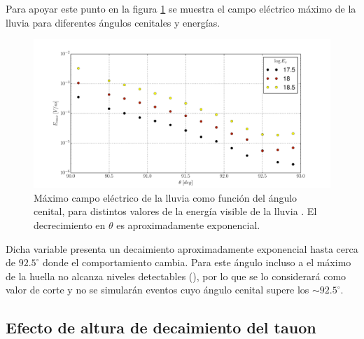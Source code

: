 	Para apoyar este punto en la figura \ref{fig:theta_dependence2} se muestra el campo el\'ectrico m\'aximo de la lluvia para diferentes \'angulos cenitales y energ\'ias.
	\begin{figure}[ht!]
		\centering
		\includegraphics[width=\textwidth]{./fig/simulacionRadio/maxDep/eMaxTh.pdf}
		\caption{\label{fig:theta_dependence2}
		M\'aximo campo el\'ectrico de la lluvia como funci\'on del \'angulo cenital, para distintos valores de la energ\'ia visible de la lluvia \ev{}. El decrecimiento en $\theta$ es aproximadamente exponencial.
		}
	\end{figure}
	Dicha variable presenta un decaimiento aproximadamente exponencial hasta cerca de $92.5^\circ$ donde el comportamiento cambia.
	Para este \'angulo incluso a  el m\'aximo de la huella no alcanza niveles detectables (),
	por lo que se lo considerar\'a como valor de corte y no se simular\'an eventos cuyo \'angulo cenital supere los $\sim92.5^\circ$.
	
	\subsection{Efecto de altura de decaimiento \xd{} del tauon}
	\label{sbsc:depXdRadio}
	
